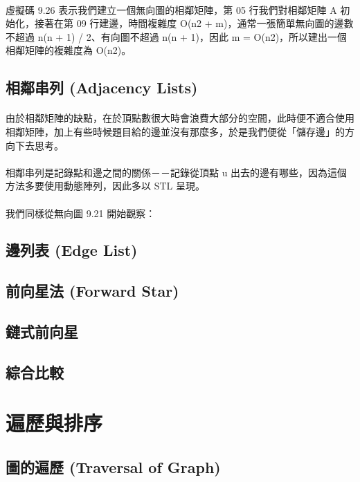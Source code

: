 \documentclass[12pt,a4paper,oneside]{report}
\begin{document}
\begin{CJK}{UTF8}{bkai}
\paragraph{}虛擬碼 9.26 表示我們建立一個無向圖的相鄰矩陣，第 05 行我們對相鄰矩陣 A 初始化，接著在第 09 行建邊，時間複雜度 O(n2 + m)，通常一張簡單無向圖的邊數不超過 n(n + 1) / 2、有向圖不超過 n(n + 1)，因此 m = O(n2)，所以建出一個相鄰矩陣的複雜度為 O(n2)。

\subsection{相鄰串列 (Adjacency Lists)}

\paragraph{}由於相鄰矩陣的缺點，在於頂點數很大時會浪費大部分的空間，此時便不適合使用相鄰矩陣，加上有些時候題目給的邊並沒有那麼多，於是我們便從「儲存邊」的方向下去思考。
\paragraph{}相鄰串列是記錄點和邊之間的關係－－記錄從頂點 u 出去的邊有哪些，因為這個方法多要使用動態陣列，因此多以 STL 呈現。
\paragraph{}我們同樣從無向圖 9.21 開始觀察：

\subsection{邊列表 (Edge List)}
\subsection{前向星法 (Forward Star)}
\subsection{鏈式前向星}
\subsection{綜合比較}

\section{遍歷與排序}
\subsection{圖的遍歷 (Traversal of Graph)}

\end{CJK}
\end{document}

